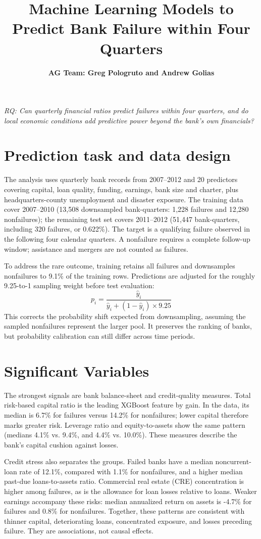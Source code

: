 \documentclass[11pt,a4paper]{article}
\title{\textbf{Machine Learning Models to Predict Bank Failure within Four Quarters}}
\author{\textbf{AG Team: Greg Pologruto and Andrew Golias}}
\date{}
\begin{document}
\maketitle

\emph{RQ: Can quarterly financial ratios predict failures within four quarters, and do local economic conditions add predictive power beyond the bank's own financials?}

\section{Prediction task and data design}
The analysis uses quarterly bank records from 2007--2012 and 20 predictors covering capital, loan quality, funding, earnings, bank size and charter, plus headquarters-county unemployment and disaster exposure. The training data cover 2007--2010 (13,508 downsampled bank-quarters: 1,228 failures and 12,280 nonfailures); the remaining test set covers 2011--2012 (51,447 bank-quarters, including 320 failures, or 0.622\%). The target is a qualifying failure observed in the following four calendar quarters. A nonfailure requires a complete follow-up window; assistance and mergers are not counted as failures.


To address the rare outcome, training retains all failures and downsamples nonfailures to 9.1\% of the training rows. Predictions are adjusted for the roughly 9.25-to-1 sampling weight before test evaluation:
\[p_{i}=\frac{\hat{y}_i}{\hat{y}_i+(1-\hat{y}_i)\times 9.25}\]
This corrects the probability shift expected from downsampling, assuming the sampled nonfailures represent the larger pool. It preserves the ranking of banks, but probability calibration can still differ across time periods.

\section{Significant Variables}
The strongest signals are bank balance-sheet and credit-quality measures. Total risk-based capital ratio is the leading XGBoost feature by gain. In the data, its median is 6.7\% for failures versus 14.2\% for nonfailures; lower capital therefore marks greater risk. Leverage ratio and equity-to-assets show the same pattern (medians 4.1\% vs. 9.4\%, and 4.4\% vs. 10.0\%). These measures describe the bank’s capital cushion against losses.


Credit stress also separates the groups. Failed banks have a median noncurrent-loan rate of 12.1\%, compared with 1.1\% for nonfailures, and a higher median past-due loans-to-assets ratio. Commercial real estate (CRE) concentration is higher among failures, as is the allowance for loan losses relative to loans. Weaker earnings accompany these risks: median annualized return on assets is -4.7\% for failures and 0.8\% for nonfailures. Together, these patterns are consistent with thinner capital, deteriorating loans, concentrated exposure, and losses preceding failure. They are associations, not causal effects.
\end{document}
